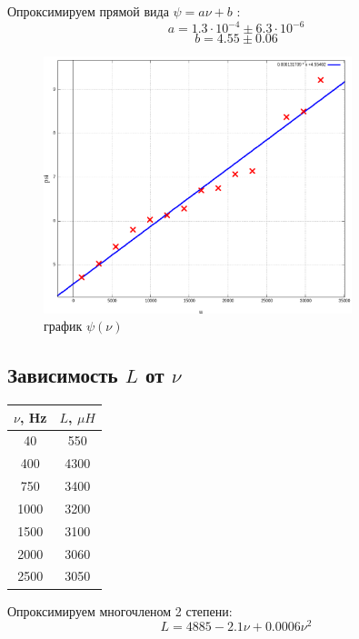 \documentclass{article}
\begin{document}
Опроксимируем прямой вида \( \psi = a\nu + b \) :
\[ a = 1.3\cdot 10^{-4} \pm 6.3\cdot 10^{-6} \]
\[ b = 4.55 \pm 0.06 \]

\begin{figure}[H]
    \centering
    \includegraphics[width=0.8\textwidth]{5.png}
    \caption{график \( \psi(\nu) \)}
\end{figure}

\subsection{Зависимость \(L\) от \(\nu\)}

\begin{table}[H]
    \centering
    \begin{tabular}{|c|c|}
    \hline
    \(\nu\), Hz & \(L\), \(\mu H\) \\\hline
    40  & 550 \\\hline
    400 & 4300\\\hline
    750 & 3400\\\hline
    1000& 3200\\\hline
    1500& 3100\\\hline
    2000& 3060\\\hline
    2500& 3050\\\hline
    \end{tabular}
\end{table}

Опроксимируем многочленом 2 степени:
\[ L = 4885 - 2.1\nu + 0.0006\nu^2 \]
\end{document}
